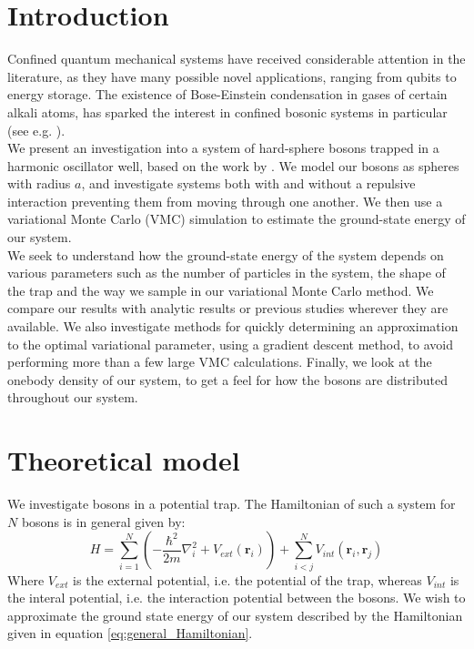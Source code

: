 \documentclass[a4paper, 10pt]{article}
\begin{document}
	\section{Introduction}
	Confined quantum mechanical systems have received considerable attention in the literature, as they have many possible novel applications, ranging from qubits to energy storage. The existence of Bose-Einstein condensation in gases of certain alkali atoms, has sparked the interest in confined bosonic systems in particular (see e.g. \cite{Nilsen2005}). \\
	\linebreak
	We present an investigation into a system of hard-sphere bosons trapped in a harmonic oscillator well, based on the work by \cite{DuBois2001}. We model our bosons as spheres with radius $a$, and investigate systems both with and without a repulsive interaction preventing them from moving through one another. We then use a variational Monte Carlo (VMC) simulation to estimate the ground-state energy of our system.\\
	\linebreak
	 We seek to understand how the ground-state energy of the system depends on various parameters such as the number of particles in the system, the shape of the trap and the way we sample in our variational Monte Carlo method. We compare our results with analytic results or previous studies wherever they are available. We also investigate methods for quickly determining an approximation to the optimal variational parameter, using a gradient descent method, to avoid performing more than a few large VMC calculations. Finally, we look at the onebody density of our system, to get a feel for how the bosons are distributed throughout our system.
	\section{Theoretical model}
	We investigate bosons in a potential trap. The Hamiltonian of such a system for $N$ bosons is in general given by:
	\begin{equation} \label{eq:general_Hamiltonian}
	H=\sum_{i=1}^N\left(-\frac{\hbar^2}{2m}\nabla_i^2 +V_{ext}(\boldsymbol{r}_i)\right)+\sum_{i<j}^N V_{int}(\boldsymbol{r}_i, \boldsymbol{r}_j)
	\end{equation}
	Where $V_{ext}$ is the external potential, i.e. the potential of the trap, whereas $V_{int}$ is the interal potential, i.e. the interaction potential between the bosons. We wish to approximate the ground state energy of our system described by the Hamiltonian given in equation \ref{eq:general_Hamiltonian}.
\end{document}
